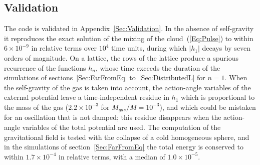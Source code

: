 \subsection{Validation}
\label{SubSec:Validation}

The code is validated in Appendix~\ref{Sec:Validation}. In the absence of self-gravity it reproduces the exact solution of the mixing of the cloud~(\ref{Eq:Pulse}) to within $6\times 10^{-9}$ in relative terms over $10^4$ time units, during which $|h_1|$ decays by seven orders of magnitude. On a lattice, the rows of the lattice produce a spurious recurrence of the functions $h_n$, whose time exceeds the duration of the simulations of sections~\ref{Sec:FarFromEq} to~\ref{Sec:DistributedL} for $n = 1$. When the self-gravity of the gas is taken into account, the action-angle variables of the external potential leave a time-independent residue in $h_1$ which is proportional to the mass of the gas ($2.2\times 10^{-3}$ for $M_{gas}/M = 10^{-3}$), and which could be mistaken for an oscillation that is not damped; this residue disappears when the action-angle variables of the total potential are used. The computation of the gravitational field is tested with the collapse of a cold homogeneous sphere, and in the simulations of section~\ref{Sec:FarFromEq} the total energy is conserved to within $1.7\times 10^{-4}$ in relative terms, with a median of $1.0\times 10^{-5}$.
